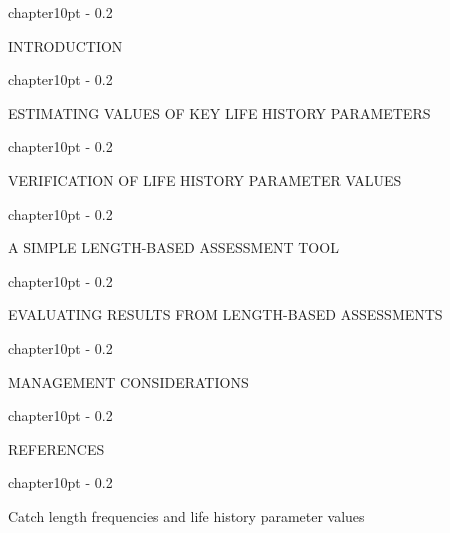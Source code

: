 \documentclass{report}
\makeatletter
\renewcommand\chapter{\@startsection%
{chapter}{1}{0pt}%
{-\baselineskip}%
{0.2\baselineskip}%
{\raggedright\bf}}%
\makeatother
\begin{document}
\large

\chapter{INTRODUCTION}


\clearpage
\newpage

\chapter{ESTIMATING VALUES OF KEY LIFE HISTORY PARAMETERS}


\clearpage
\newpage

\chapter{VERIFICATION OF LIFE HISTORY PARAMETER VALUES}


\clearpage
\newpage

\chapter{A SIMPLE LENGTH-BASED ASSESSMENT TOOL}


\clearpage
\newpage

\chapter{EVALUATING RESULTS FROM LENGTH-BASED ASSESSMENTS}


\clearpage
\newpage

\chapter{MANAGEMENT CONSIDERATIONS}


\clearpage
\newpage

\chapter{REFERENCES}


\clearpage
\newpage

\chapter{Catch length frequencies and life history parameter values}

\end{document}
